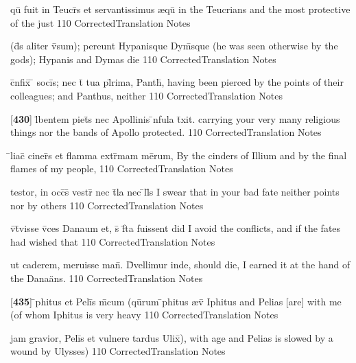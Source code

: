 \latline
  {qu\={\macron {\i}} fuit in Teucr\={\macron {\i}}s et servantissimus {\ae}qu\={\macron {\i}}}
  { in the Teucrians and the most protective of the just  }
  {110}
  { CorrectedTranslation }
  { Notes }


\latline
  {(d\={\macron {\i}}s aliter v\={\macron {\i}}sum); pereunt Hypanisque Dym\={}sque}
  { (he was seen otherwise by the gods); Hypanis and Dymas die }
  {110}
  { CorrectedTranslation }
  { Notes }


\latline
  {c\={}nfix\={\macron {\i}} \={} soci\={\macron {\i}}s; nec t\={} tua pl\={}rima, Panth\={},}
  { having been pierced by the points of their colleagues; and Panthus, neither  }
  {110}
  { CorrectedTranslation }
  { Notes }


\latline
  {[\textbf{430}] l\={}bentem piet\={}s nec Apollinis \={\macron {\i}}nfula t\={}xit.}
  { carrying your very many religious things nor the bands of Apollo protected. }
  {110}
  { CorrectedTranslation }
  { Notes }


\latline
  {\={}liac\={\macron {\i}} ciner\={}s et flamma extr\={}mam me\={}rum,}
  { By the cinders of Illium and by the final flames of my people, }
  {110}
  { CorrectedTranslation }
  { Notes }


\latline
  {testor, in occ\={}s\={} vestr\={} nec t\={}la nec \={}ll\={}s}
  { I swear that in your bad fate neither points nor by others  }
  {110}
  { CorrectedTranslation }
  { Notes }


\latline
  {v\={\macron {\i}}t\={}visse v\={\macron {\i}}ces Danaum et, s\={\macron {\i}} f\={}ta fuissent}
  { did I avoid the conflicts, and if the fates had wished that   }
  {110}
  { CorrectedTranslation }
  { Notes }


\latline
  {ut caderem, meruisse man\={}.  D\={\macron {\i}}vellimur inde,}
  { should die, I earned it at the hand of the Dana\"ans. }
  {110}
  { CorrectedTranslation }
  { Notes }


\latline
  {[\textbf{435}] \={}phitus et Peli\={}s m\={}cum (qu\={}rum \={}phitus {\ae}v\={}}
  { Iphitus and Pelias [are] with me (of whom Iphitus is very heavy }
  {110}
  { CorrectedTranslation }
  { Notes }


\latline
  {jam gravior, Peli\={}s et vulnere tardus Ulix\={\macron {\i}}),}
  { with age and Pelias is slowed by a wound by Ulysses) }
  {110}
  { CorrectedTranslation }
  { Notes }


